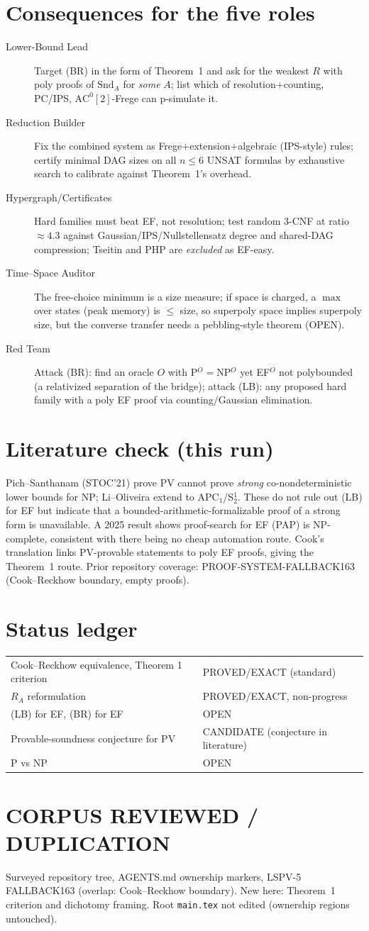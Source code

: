 \documentclass[11pt]{article}
\begin{document}
\section{Consequences for the five roles}
\begin{description}
\item[Lower-Bound Lead] Target (BR) in the form of Theorem~1 and ask for the weakest
$R$ with poly proofs of $\mathrm{Snd}_A$ for \emph{some} $A$; list which of
resolution+counting, PC/IPS, $\mathrm{AC}^0[2]$-Frege can p-simulate it.
\item[Reduction Builder] Fix the combined system as Frege$+$extension$+$algebraic
(IPS-style) rules; certify minimal DAG sizes on all $n\le 6$ UNSAT formulas by
exhaustive search to calibrate against Theorem~1's overhead.
\item[Hypergraph/Certificates] Hard families must beat EF, not resolution; test random
3-CNF at ratio $\approx4.3$ against Gaussian/IPS/Nullstellensatz degree and
shared-DAG compression; Tseitin and PHP are \emph{excluded} as EF-easy.
\item[Time--Space Auditor] The free-choice minimum is a size measure; if space is
charged, a $\max$ over states (peak memory) is $\le$ size, so superpoly space implies
superpoly size, but the converse transfer needs a pebbling-style theorem (OPEN).
\item[Red Team] Attack (BR): find an oracle $O$ with P$^O=$NP$^O$ yet EF$^O$ not
polybounded (a relativized separation of the bridge); attack (LB): any proposed
hard family with a poly EF proof via counting/Gaussian elimination.
\end{description}

\section{Literature check (this run)}
Pich--Santhanam (STOC'21) prove PV cannot prove \emph{strong} co-nondeterministic
lower bounds for NP; Li--Oliveira extend to APC$_1$/S$^1_2$. These do not rule out
(LB) for EF but indicate that a bounded-arithmetic-formalizable proof of a strong
form is unavailable. A 2025 result shows proof-search for EF (PAP) is NP-complete,
consistent with there being no cheap automation route. Cook's translation links
PV-provable statements to poly EF proofs, giving the Theorem~1 route. Prior
repository coverage: PROOF-SYSTEM-FALLBACK163 (Cook--Reckhow boundary, empty proofs).

\section{Status ledger}
\begin{tabular}{ll}
Cook--Reckhow equivalence, Theorem 1 criterion & PROVED/EXACT (standard)\\
$R_A$ reformulation & PROVED/EXACT, non-progress\\
(LB) for EF, (BR) for EF & OPEN\\
Provable-soundness conjecture for PV & CANDIDATE (conjecture in literature)\\
P vs NP & OPEN
\end{tabular}
\section*{CORPUS REVIEWED / DUPLICATION}
Surveyed repository tree, AGENTS.md ownership markers, LSPV-5 FALLBACK163 (overlap:
Cook--Reckhow boundary). New here: Theorem~1 criterion and dichotomy framing. Root
\texttt{main.tex} not edited (ownership regions untouched).
\end{document}
